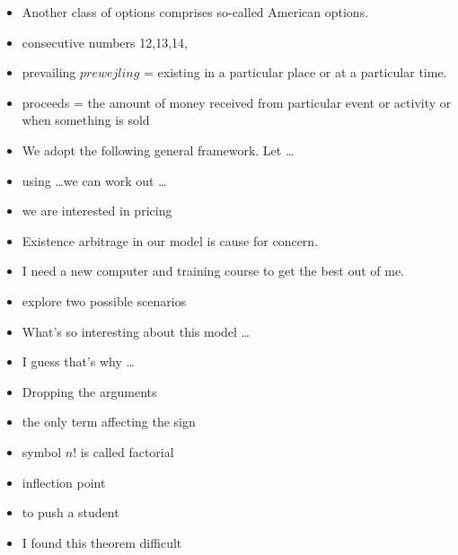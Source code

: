 \documentclass{book}
\begin{document}
\begin{itemize}
\item Another class of options comprises so-called American options.
\item consecutive numbers 12,13,14,
\item prevailing $prewejling$ = existing in a particular place or at a particular time.
\item proceeds = the amount of money received from particular event or activity or when something is sold
\item We adopt the following general framework. Let \dots
\item using \dots we can work out \dots
\item we are interested in pricing
\item Existence arbitrage in our model is cause for concern.
\item I need a new computer and training course to get the best out of me.
\item explore two possible scenarios
\item What's so interesting about this model \dots
\item I guess that's why \dots
\item Dropping the arguments
\item the only term affecting the sign
\item symbol $n!$ is called factorial
\item inflection point
\item to push a student
\item I found this theorem difficult
\end{itemize}
\end{document}
